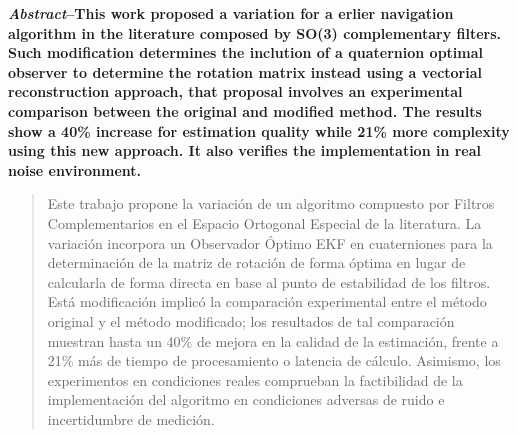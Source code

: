 \documentclass[conference]{IEEEtran}
\begin{document}
\maketitle
\textbf{\small \emph{Abstract}--This work proposed a variation for a erlier navigation algorithm in the literature composed by SO(3) complementary filters. Such modification determines the inclution of a quaternion optimal observer to determine  the rotation matrix instead using a vectorial reconstruction approach, that proposal involves an experimental comparison between the original and modified method. The results show a 40\% increase for estimation quality while 21\% more complexity using this new approach. It also verifies the implementation in real noise environment.\\[3mm]}
\begin{abstract}
Este trabajo propone la variación de un algoritmo compuesto por Filtros Complementarios en el Espacio Ortogonal Especial de la literatura. La variación incorpora un Observador Óptimo EKF en cuaterniones para la determinación de la matriz de rotación de forma óptima en lugar de calcularla de forma directa en base al punto de estabilidad de los filtros. Está modificación implicó la comparación experimental entre el método original y el método modificado; los resultados de tal comparación muestran hasta un 40\% de mejora en la calidad de la estimación, frente a 21\% más de tiempo de procesamiento o latencia de cálculo. Asimismo, los experimentos en condiciones reales comprueban la factibilidad de la implementación del algoritmo en condiciones adversas de ruido e incertidumbre de medición.\end{abstract}





%
\IEEEpeerreviewmaketitle
\end{document}
